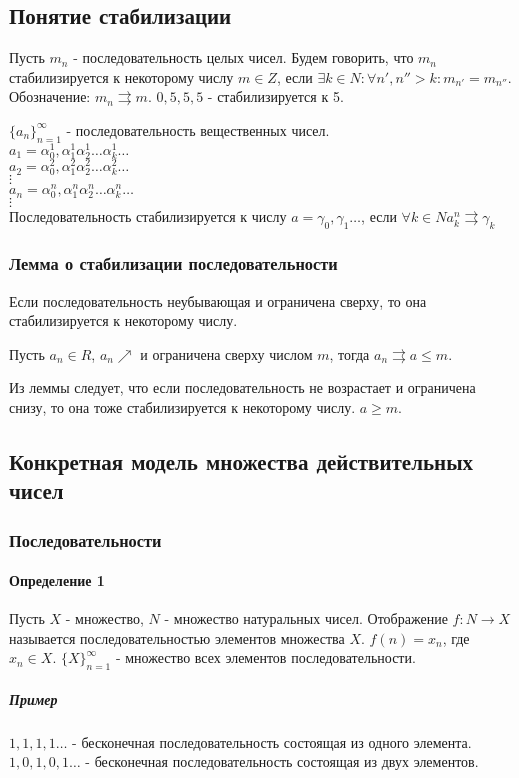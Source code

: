 \documentclass[10pt]{article}
\begin{document}
	\subsection{Понятие стабилизации}
			Пусть $m_n$ - последовательность целых чисел. Будем говорить, что $m_n$ стабилизируется к некоторому числу $m \in Z$, если $\exists k \in N : \forall n',n'' > k : m_{n'} = m_{n''}$. Обозначение: $m_n \rightrightarrows m$. $0,5,5,5$ - стабилизируется к 5.
			
			$\{a_n\}_{n=1}^\infty$ - последовательность вещественных чисел.\\
			$a_1 = \alpha_0^1, \alpha_1^1\alpha_2^1\dots\alpha_k^1\dots$\\
			$a_2 = \alpha_0^2, \alpha_1^2\alpha_2^2\dots\alpha_k^2\dots$\\
			$\vdots$\\
			$a_n = \alpha_0^n, \alpha_1^n\alpha_2^n\dots\alpha_k^n\dots$\\
			$\vdots$\\
			Последовательность стабилизируется к числу $a = \gamma_0, \gamma_1\dots$, если $\forall k \in N a_k^n \rightrightarrows \gamma_k$
		\subsubsection{Лемма о стабилизации последовательности}
			Если последовательность неубывающая и ограничена сверху, то она стабилизируется к некоторому числу.
			
			Пусть $a_n \in R$, $a_n \nearrow$ и ограничена сверху числом $m$, тогда $a_n \rightrightarrows a 
			\le m$.
			
			Из леммы следует, что если последовательность не возрастает и ограничена снизу, то она тоже стабилизируется к некоторому числу. $a \geq m$.	
				
		\subsection{Конкретная модель множества действительных чисел}
			\subsubsection{Последовательности}
				\paragraph{Определение 1} Пусть $X$ - множество, $N$ - множество натуральных чисел. Отображение $f: N \to X$ называется последовательностью элементов множества $X$. $f(n) = x_n$, где $x_n \in X$. $\{X\}_{n=1}^\infty$ - множество всех элементов последовательности.
				\subparagraph{Пример} $1,1,1,1 \dots$ - бесконечная последовательность состоящая из одного элемента. $1,0,1,0,1 \dots$ - бесконечная последовательность состоящая из двух элементов.
				
\end{document}
